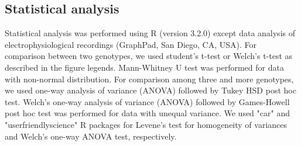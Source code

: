 \subsection*{Statistical analysis}

Statistical analysis was performed using R (version 3.2.0)\cite{R} except data analysis of electrophysiological recordings (GraphPad, San Diego, CA, USA).
For comparison between two genotypes, we used student's t-test or Welch's t-test as described in the figure legends.
Mann-Whitney U test was performed for data with non-normal distribution.
For comparison among three and more genotypes, we used one-way analysis of variance (ANOVA) followed by Tukey HSD post hoc test. 
Welch's one-way analysis of variance (ANOVA) followed by Games-Howell post hoc test was performed for data with unequal variance.
We used "car"\cite{car} and "userfriendlyscience"\cite{user} R packages for Levene's test for homogeneity of variances and Welch's one-way ANOVA test, respectively. 
  
  
  
  
  
  
  
  
  